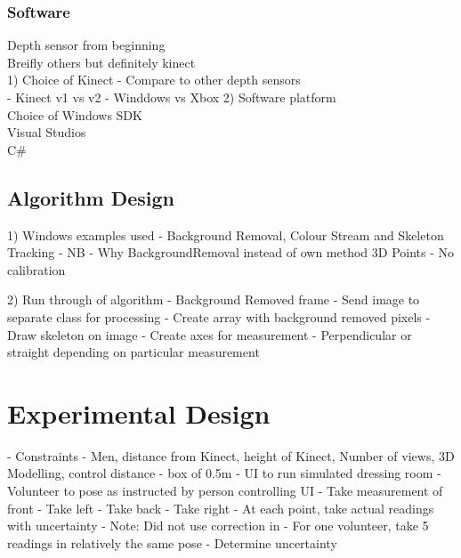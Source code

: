 \subsubsection{Software}
Depth sensor from beginning\\
Breifly others but definitely kinect\\ 
1) Choice of Kinect - Compare to other depth sensors\\
- Kinect v1 vs v2
- Winddows vs Xbox
2) Software platform\\ 
Choice of Windows SDK\\
Visual Studios\\
C\#\\

\subsection{Algorithm Design}
1) Windows examples used - Background Removal, Colour Stream and Skeleton Tracking - NB - Why BackgroundRemoval instead of own method
3D Points - No calibration

2) Run through of algorithm
- Background Removed frame
- Send image to separate class for processing
- Create array with background removed pixels
- Draw skeleton on image
- Create axes for measurement - Perpendicular or straight depending on particular measurement

\section{Experimental Design}
- Constraints - Men, distance from Kinect, height of Kinect, Number of views, 3D Modelling, control distance - box of 0.5m
- UI to run simulated dressing room
- Volunteer to pose as instructed by person controlling UI
- Take measurement of front
- Take left
- Take back
- Take right 
- At each point, take actual readings with uncertainty
- Note: Did not use correction in \cite{nonContact2017}
- For one volunteer, take 5 readings in relatively the same pose - Determine uncertainty 